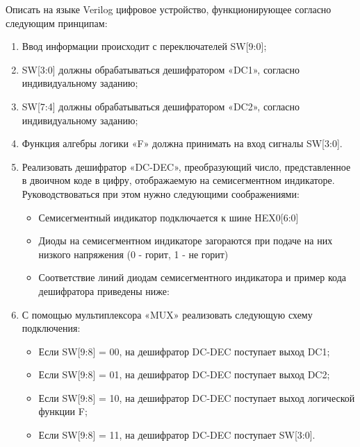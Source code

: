 \par{Описать на языке Verilog цифровое устройство, функционирующее согласно следующим принципам:}
\begin{enumerate}
  \item Ввод информации происходит с переключателей SW[9:0];
  \item SW[3:0] должны обрабатываться дешифратором «DC1», согласно индивидуальному заданию;
  \item SW[7:4] должны обрабатываться дешифратором «DC2», согласно индивидуальному заданию;
  \item Функция алгебры логики «F» должна принимать на вход сигналы SW[3:0].

  \item Реализовать дешифратор «DC-DEC», преобразующий число, представленное в двоичном коде в цифру, отображаемую на семисегментном индикаторе. Руководствоваться при этом нужно следующими соображениями:
    \begin{itemize}
      \item Семисегментный индикатор подключается к шине HEX0[6:0]
      \item Диоды на семисегментном индикаторе загораются при подаче на них низкого напряжения (0 - горит, 1 - не горит)
      \item Соответствие линий диодам семисегментного индикатора и пример кода дешифратора приведены ниже:
        \begin{figure}[H]
          \centering
          \def\svgwidth{\columnwidth}
          
          \label{fig:decoder}
        \end{figure}

        \noindent
        \begin{minipage}{\linewidth}
          
        \end{minipage}



    \end{itemize}
    \item С помощью мультиплексора «MUX» реализовать следующую схему подключения:
      \begin{itemize}
        \item Если SW[9:8] = 00, на дешифратор DC-DEC поступает выход DC1;
        \item Если SW[9:8] = 01, на дешифратор DC-DEC поступает выход DC2;
        \item Если SW[9:8] = 10, на дешифратор DC-DEC поступает выход логической функции F;
        \item Если SW[9:8] = 11, на дешифратор DC-DEC поступает SW[3:0].
      \end{itemize}
\end{enumerate}



